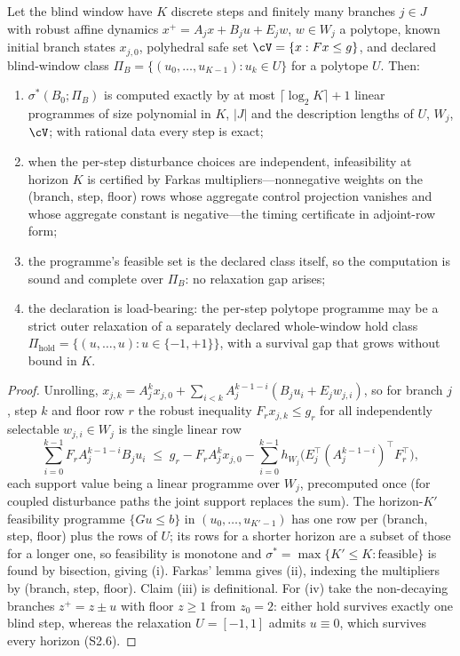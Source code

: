 \begin{theorem}\label{thm:lp}
Let the blind window have $K$ discrete steps and finitely many branches $j\in J$ with robust affine dynamics $x^+=A_jx+B_ju+E_jw$, $w\in W_j$ a polytope, known initial branch states $x_{j,0}$, polyhedral safe set $\cV=\{x:Fx\le g\}$, and declared blind-window class $\Pi_B=\{(u_0,\dots,u_{K-1}):u_k\in U\}$ for a polytope $U$. Then:
\begin{enumerate}[label=(\roman*),leftmargin=2.2em,itemsep=1pt]
\item $\sigma^*(B_0;\Pi_B)$ is computed exactly by at most $\lceil\log_2K\rceil+1$ linear programmes of size polynomial in $K$, $|J|$ and the description lengths of $U$, $W_j$, $\cV$; with rational data every step is exact;
\item when the per-step disturbance choices are independent, infeasibility at horizon $K$ is certified by Farkas multipliers---nonnegative weights on the (branch, step, floor) rows whose aggregate control projection vanishes and whose aggregate constant is negative---the timing certificate in adjoint-row form;
\item the programme's feasible set is the declared class itself, so the computation is sound and complete over $\Pi_B$: no relaxation gap arises;
\item the declaration is load-bearing: the per-step polytope programme may be a strict outer relaxation of a separately declared whole-window hold class $\Pi_{\mathrm{hold}}=\{(u,\dots,u):u\in\{-1,+1\}\}$, with a survival gap that grows without bound in $K$.
\end{enumerate}
\end{theorem}

\begin{proof}
Unrolling, $x_{j,k}=A_j^kx_{j,0}+\sum_{i<k}A_j^{k-1-i}(B_ju_i+E_jw_{j,i})$, so for branch $j$, step $k$ and floor row $r$ the robust inequality $F_rx_{j,k}\le g_r$ for all independently selectable $w_{j,i}\in W_j$ is the single linear row
\begin{equation}\label{eq:lprow}
\sum_{i=0}^{k-1}F_rA_j^{k-1-i}B_ju_i\;\le\;g_r-F_rA_j^kx_{j,0}-\sum_{i=0}^{k-1}h_{W_j}\!\bigl(E_j^\top(A_j^{k-1-i})^\top F_r^\top\bigr),
\end{equation}
each support value being a linear programme over $W_j$, precomputed once (for coupled disturbance paths the joint support replaces the sum). The horizon-$K'$ feasibility programme $\{Gu\le b\}$ in $(u_0,\dots,u_{K'-1})$ has one row per (branch, step, floor) plus the rows of $U$; its rows for a shorter horizon are a subset of those for a longer one, so feasibility is monotone and $\sigma^*=\max\{K'\le K:\text{feasible}\}$ is found by bisection, giving (i). Farkas' lemma gives (ii), indexing the multipliers by (branch, step, floor). Claim (iii) is definitional. For (iv) take the non-decaying branches $z^+=z\pm u$ with floor $z\ge1$ from $z_0=2$: either hold survives exactly one blind step, whereas the relaxation $U=[-1,1]$ admits $u\equiv0$, which survives every horizon (S2.6).
\end{proof}

